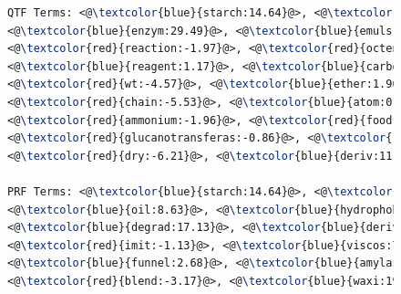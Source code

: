\begin{figure}[htpb]
\begin{framed}
\begin{lstlisting}[basicstyle=\small\ttfamily , linewidth=\columnwidth,breaklines=true, language=TeX]
QTF Terms: <@\textcolor{blue}{starch:14.64}@>, <@\textcolor{blue}{emulsifi:6.72}@>, <@\textcolor{red}{succin:-3.46}@>, 
<@\textcolor{blue}{enzym:29.49}@>, <@\textcolor{blue}{emuls:12.66}@>, <@\textcolor{blue}{hydrophob:5.45}@>, <@\textcolor{red}{anhydrid:-5.47}@>, 
<@\textcolor{red}{reaction:-1.97}@>, <@\textcolor{red}{octenyl:-0.66}@>, <@\textcolor{blue}{stabil:3.64}@>, <@\textcolor{blue}{alkenyl:0.06}@>, 
<@\textcolor{blue}{reagent:1.17}@>, <@\textcolor{blue}{carbon:0.12}@>, <@\textcolor{blue}{potato:3.74}@>, <@\textcolor{red}{alkyl:-0.33}@>, 
<@\textcolor{red}{wt:-4.57}@>, <@\textcolor{blue}{ether:1.96}@>, <@\textcolor{red}{enzymat:-3.45}@>, <@\textcolor{blue}{convers:10.44}@>, 
<@\textcolor{red}{chain:-5.53}@>, <@\textcolor{blue}{atom:0.03}@>, <@\textcolor{red}{ph:-4.55}@>, <@\textcolor{red}{treat:-0.89}@>, 
<@\textcolor{red}{ammonium:-1.96}@>, <@\textcolor{red}{food:-11.94}@>, <@\textcolor{red}{amylos:-20.15}@>, 
<@\textcolor{red}{glucanotransferas:-0.86}@>, <@\textcolor{red}{glycidyl:-0.40}@>, <@\textcolor{red}{glycosyl:-0.02}@>, 
<@\textcolor{red}{dry:-6.21}@>, <@\textcolor{blue}{deriv:11.97}@>, <@\textcolor{blue}{transferas:0.89}@>, <@\textcolor{red}{foam:-0.49}@>, 

PRF Terms: <@\textcolor{blue}{starch:14.64}@>, <@\textcolor{blue}{encapsul:17.50}@>, <@\textcolor{red}{chees:-4.22}@>, 
<@\textcolor{blue}{oil:8.63}@>, <@\textcolor{blue}{hydrophob:5.45}@>, <@\textcolor{blue}{agent:5.19}@>, <@\textcolor{red}{casein:-2.19}@>, 
<@\textcolor{blue}{degrad:17.13}@>, <@\textcolor{blue}{deriv:11.97}@>, <@\textcolor{blue}{tablet:5.30}@>, <@\textcolor{red}{debranch:-10.58}@>, 
<@\textcolor{red}{imit:-1.13}@>, <@\textcolor{blue}{viscos:7.77}@>, <@\textcolor{blue}{oxid:5.97}@>, <@\textcolor{blue}{activ:5.98}@>, <@\textcolor{blue}{osa:9.32}@>, 
<@\textcolor{blue}{funnel:2.68}@>, <@\textcolor{blue}{amylas:26.06}@>, <@\textcolor{red}{amylopectin:-7.14}@>, <@\textcolor{blue}{maiz:20.61}@>, 
<@\textcolor{red}{blend:-3.17}@>, <@\textcolor{blue}{waxi:19.41}@>, <@\textcolor{blue}{convert:31.81}@>, 


\end{lstlisting}
\end{framed}
\end{figure}
